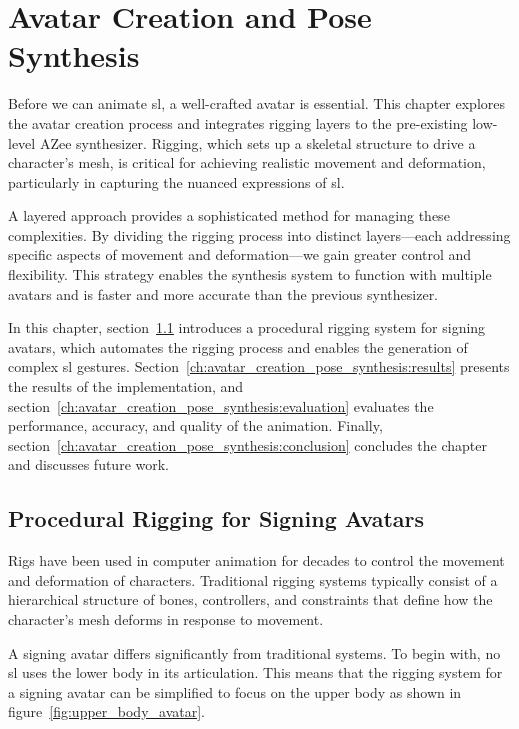 \documentclass[../../main.tex]{subfiles}
\begin{document}
\chapter{Avatar Creation and Pose Synthesis}
\label{ch:avatar_creation_pose_synthesis}

Before we can animate \gls{sl}, a well-crafted avatar is essential. This chapter explores the avatar creation process and integrates rigging layers to the pre-existing low-level AZee synthesizer. Rigging, which sets up a skeletal structure to drive a character's mesh, is critical for achieving realistic movement and deformation, particularly in capturing the nuanced expressions of \gls{sl}.

A layered approach provides a sophisticated method for managing these complexities. By dividing the rigging process into distinct layers—each addressing specific aspects of movement and deformation—we gain greater control and flexibility. This strategy enables the synthesis system to function with multiple avatars and is faster and more accurate than the previous synthesizer.

In this chapter, section~\ref{ch:avatar_creation_pose_synthesis:proc_rig_signing_avatars} introduces a procedural rigging system for signing avatars, which automates the rigging process and enables the generation of complex \gls{sl} gestures. Section~\ref{ch:avatar_creation_pose_synthesis:results} presents the results of the implementation, and section~\ref{ch:avatar_creation_pose_synthesis:evaluation} evaluates the performance, accuracy, and quality of the animation. Finally, section~\ref{ch:avatar_creation_pose_synthesis:conclusion} concludes the chapter and discusses future work.

\section{Procedural Rigging for Signing Avatars}
\label{ch:avatar_creation_pose_synthesis:proc_rig_signing_avatars}

Rigs have been used in computer animation for decades to control the movement and deformation of characters. Traditional rigging systems typically consist of a hierarchical structure of bones, controllers, and constraints that define how the character’s mesh deforms in response to movement.

A signing avatar differs significantly from traditional systems. To begin with, no \gls{sl} uses the lower body in its articulation. This means that the rigging system for a signing avatar can be simplified to focus on the upper body as shown in figure~\ref{fig:upper_body_avatar}. 
\end{document}
